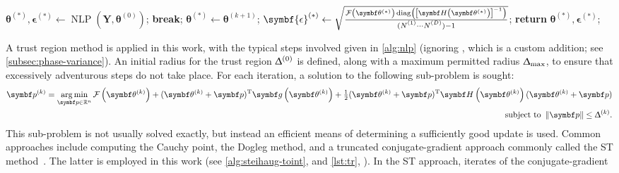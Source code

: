 \begin{algorithm}
\begin{algorithmic}[1]
                    \State $\symbf{\theta}^{(*)}, \symbf{\epsilon}^{(*)} \gets \operatorname{NLP}\left(\symbf{Y}, \symbf{\theta}^{(0)}\right)$;
                \EndIf\label{state:neg-amp-end}
                    \State \textbf{break};
                \EndIf
            \EndFor
            \State $\symbf{\theta}^{(*)} \gets \symbf{\theta}^{(k+1)}$;
            \State $\symbf{\epsilon}^{(*)} \gets
                \sqrt{
                    \frac
                    {
                        \Fthstar \diag \left(
                            \left[\bdHthstar\right]^{-1}
                        \right)
                    }
                    {(\None \cdots \ND) - 1}
                }$;
            \label{state:epsilon}
            \State \textbf{return} $\symbf{\theta}^{(*)}, \symbf{\epsilon}^{(*)}$;
        \EndProcedure
    \end{algorithmic}
\end{algorithm}
A trust region method is applied in this work,
with the typical steps involved given in
\cref{alg:nlp} (ignoring , which is a custom addition;
see \cref{subsec:phase-variance}). An initial radius for the trust region
$\Updelta^{(0)}$ is defined, along with a maximum permitted radius
$\Updelta_{\text{max}}$, to ensure that excessively adventurous steps do not take place.
For each iteration, a solution to the following sub-problem is sought:
\begin{equation}
    \begin{split}
        \bpk = \argmin_{\bp \in \mathbb{R}^{n}}
            \Fthk +
            (\bthk + \bp)\T \bdgthk +
            \tfrac{1}{2} (\bthk + \bp)\T \bdHthk (\bthk + \bp) \\
        \text{subject to } \left \lVert \bp \right \rVert \leq \trustradius{k}.
    \end{split}
\end{equation}
This sub-problem is not usually solved exactly, but instead an efficient
means of determining a sufficiently good update is used.
Common approaches include computing the Cauchy point, the Dogleg
method, and a truncated conjugate-gradient
approach commonly called the \ac{ST} method~\cite[Chapter 7]{Nocedal2006}.
The latter is employed in this work (see \cref{alg:steihaug-toint},
 and \cref{lst:tr}, ). In the
\ac{ST} approach, iterates of the conjugate-gradient
